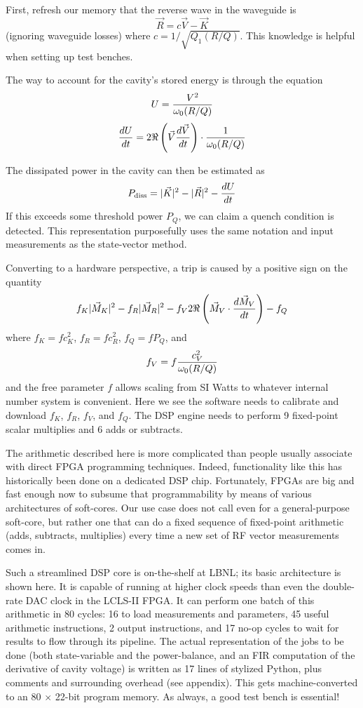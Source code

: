 First, refresh our memory that the reverse wave in the waveguide is
$$ \vec R = c \vec V - \vec K $$
(ignoring waveguide losses) where $c = 1/\sqrt{Q_1(R/Q)}$.
This knowledge is helpful when setting up test benches.

The way to account for the cavity's stored energy is through the
equation
$$ U = {V^2\over \omega_0 (R/Q)}$$
$$ {dU\over dt} = 2 \Re\left(\vec V {d\vec V\over dt}\right) \cdot {1\over \omega_0 (R/Q)}$$

The dissipated power in the cavity can then be estimated as
$$ P_{\rm diss} = |\vec K|^2 - |\vec R|^2 - {dU\over dt}$$
If this exceeds some threshold power $P_Q$, we can claim a quench
condition is detected.  This representation purposefully uses the
same notation and input measurements as the state-vector method.

Converting to a hardware perspective, a trip is caused by a positive
sign on the quantity
$$ f_K|\vec M_K|^2 - f_R|\vec M_R|^2 -
  f_V 2\Re\left( \vec M_V \cdot {d\vec M_V\over dt} \right) - f_Q$$
where $f_K = fc_K^2$, $f_R = fc_R^2$, $f_Q = fP_Q$, and
$$ f_V = f {c_V^2 \over \omega_0 (R/Q)}$$
and the free parameter $f$ allows scaling from SI Watts to whatever
internal number system is convenient.  Here we see the software needs
to calibrate and download $f_K$, $f_R$, $f_V$, and $f_Q$.  The DSP
engine needs to perform 9 fixed-point scalar multiplies and
6 adds or subtracts.

The arithmetic described here is more complicated than people usually
associate with direct FPGA programming techniques.  Indeed,
functionality like this has historically been done on a dedicated DSP chip.
Fortunately, FPGAs are big and fast enough now to subsume that programmability
by means of various architectures of soft-cores.  Our use case does not
call even for a general-purpose soft-core, but rather one that can do
a fixed sequence of fixed-point arithmetic (adds, subtracts, multiplies)
every time a new set of RF vector measurements comes in.

Such a streamlined DSP core is on-the-shelf at LBNL; its basic architecture
is shown here.
\medskip
{}
\smallskip
It is capable of running at higher clock speeds than even the double-rate
DAC clock in the LCLS-II FPGA.  It can perform one batch of this
arithmetic in 80 cycles:  16 to load measurements and parameters,
45 useful arithmetic instructions, 2 output instructions,
and 17 no-op cycles to wait for results to flow through its pipeline.
The actual representation of the jobs to be done (both state-variable
and the power-balance, and an FIR computation of the derivative of cavity
voltage) is written as 17 lines of stylized Python, plus
comments and surrounding overhead (see appendix).  This gets
machine-converted to an 80 $\times$ 22-bit program memory.
As always, a good test bench is essential!

